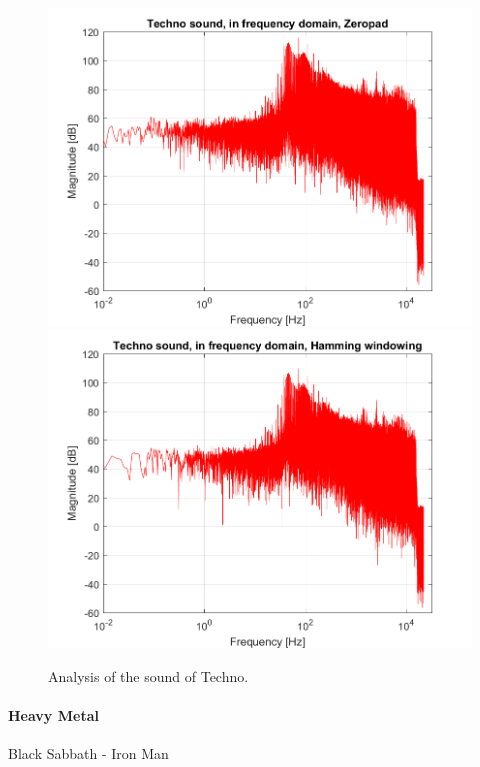 \begin{figure}[htb!]
	{\includegraphics[width=0.45\linewidth]{code/Techno_figure4.png}}
	{\includegraphics[width=0.45\linewidth]{code/Techno_figure5.png}}
	\caption{Analysis of the sound of Techno.}\label{fig:techno}
\end{figure}

\paragraph{Heavy Metal}
Black Sabbath - Iron Man

